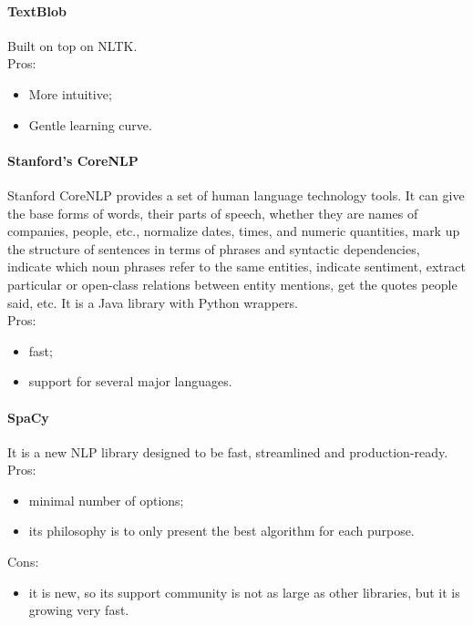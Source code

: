 \paragraph{TextBlob}
Built on top on NLTK\cite{textblob}.\\
Pros: 
\begin{itemize}
\item More intuitive; 
\item Gentle learning curve. 
\end{itemize} 

\paragraph{Stanford's CoreNLP}
Stanford CoreNLP provides a set of human language technology tools. It can give the base forms of words, their parts of speech, whether they are names of companies, people, etc., normalize dates, times, and numeric quantities, mark up the structure of sentences in terms of phrases and syntactic dependencies, indicate which noun phrases refer to the same entities, indicate sentiment, extract particular or open-class relations between entity mentions, get the quotes people said, etc.\cite{stanfordcorenlp} It is a Java library with Python wrappers. \\
Pros:
\begin{itemize}
\item fast;
\item support for several major languages. 
\end{itemize}

\paragraph{SpaCy}
It is a new NLP library designed to be fast, streamlined and production-ready\cite{spacy}.\\
Pros:
\begin{itemize}
\item minimal number of options;
\item its philosophy is to only present the best algorithm for each purpose. 
\end{itemize}
Cons:
\begin{itemize}
\item it is new, so its support community is not as large as other libraries, but it is growing very fast.
\end{itemize}



